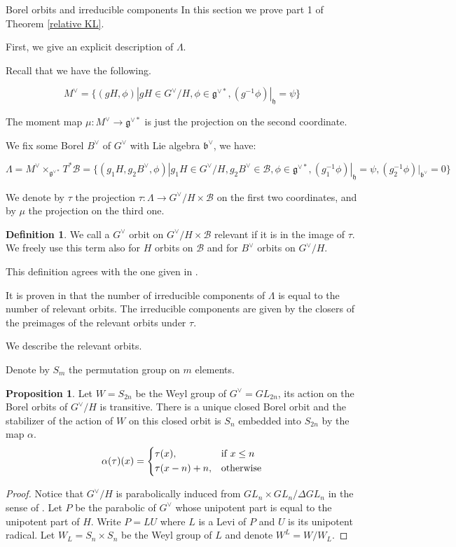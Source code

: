 \documentclass[12pt]{article}
\newcommand{\B}{\mathcal{B}}
\newcommand{\<}{\langle}
\renewcommand{\>}{\rangle}
\theoremstyle{plain}
\theoremstyle{definition}
\newtheorem{prop}[theorem]{Proposition}
\newtheorem{defn}[theorem]{Definition}
\begin{document}
\begin{section}{Borel orbits and irreducible components}\label{s3}
In this section we prove part 1 of Theorem \ref{relative KL}.

First, we give an explicit description of $\Lambda$.

Recall that we have the following.

$$M^\vee=\{(gH,\phi)|gH\in G^\vee/H,\phi\in \mathfrak{g}^{\vee*},(g^{-1}\phi)|_\mathfrak{h}=\psi\}$$

The moment map $\mu:M^\vee\rightarrow \mathfrak{g}^{\vee*}$ is just the projection on the second coordinate.

We fix some Borel $B^\vee$ of $G^\vee$ with Lie algebra $\mathfrak{b}^\vee$, we have:  

$$\Lambda=M^\vee\times_{\mathfrak{g}^{\vee*}}T^*\B=\{(g_1H,g_2B^\vee,\phi)|g_1H\in G^\vee/H,g_2B^\vee\in \B,\phi\in \mathfrak{g}^{\vee*},(g^{-1}_1\phi)|_\mathfrak{h}=\psi,(g^{-1}_2\phi)|_{\mathfrak{b}^\vee}=0\}$$

We denote by $\tau$ the projection $\tau:\Lambda\rightarrow G^\vee/H\times \B$ on the first two coordinates, and by $\mu$ the projection on the third one.

\begin{defn}
    We call a $G^\vee$ orbit on $G^\vee/H\times \B$ relevant if it is in the image of $\tau$. We freely use this term also for $H$ orbits on $\B$ and for $B^\vee$ orbits on $G^\vee/H$.

    This definition agrees with the one given in \cite{kononenko2024lagrangiansubvarietieshypersphericalvarieties}.
\end{defn}

It is proven in \cite{kononenko2024lagrangiansubvarietieshypersphericalvarieties} that the number of irreducible components of $\Lambda$ is equal to the number of relevant orbits. The irreducible components are given by the closers of the preimages of the relevant orbits under $\tau$.

We describe the relevant orbits. 

Denote by $S_m$ the permutation group on $m$ elements.

\begin{prop}
    Let $W=S_{2n}$ be the Weyl group of $G^\vee=GL_{2n}$, its action on the Borel orbits of $G^\vee/H$ is transitive. There is a unique closed Borel orbit and the stabilizer of the action of $W$ on this closed orbit is $S_n$ embedded into $S_{2n}$ by the map $\alpha$.  $$\alpha(\tau)(x)=\begin{dcases}
    \tau(x),& \text{if } x\leq n\\
    \tau(x-n)+n,              & \text{otherwise}
\end{dcases}$$
\end{prop}
\begin{proof}
    Notice that $G^\vee/H$ is parabolically induced from $GL_n\times GL_n/\Delta GL_n$ in the sense of \cite{Brion2001OnOC}. Let $P$ be the parabolic of $G^\vee$ whose unipotent part is equal to the unipotent part of $H$. Write $P=LU$ where $L$ is a Levi of $P$ and $U$ is its unipotent radical. Let $W_L=S_n\times S_n$ be the Weyl group of $L$ and denote $W^L=W/W_L$.
    

\end{proof}
\end{section}
\end{document}
